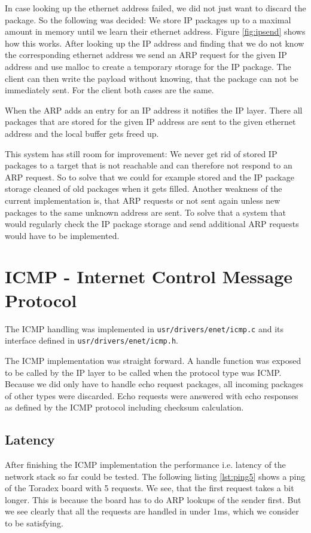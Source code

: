 In case looking up the ethernet address failed, we did not just want to discard the package. So the following was decided: We store IP packages up to a maximal amount in memory until we learn their ethernet address. Figure \ref{fig:ipsend} shows how this works. After looking up the IP address and finding that we do not know the corresponding ethernet address we send an ARP request for the given IP address and use malloc to create a temporary storage for the IP package. The client can then write the payload without knowing, that the package can not be immediately sent. For the client both cases are the same.

When the ARP adds an entry for an IP address it notifies the IP layer. There all packages that are stored for the given IP address are sent to the given ethernet address and the local buffer gets freed up.

This system has still room for improvement: We never get rid of stored IP packages to a target that is not reachable and can therefore not respond to an ARP request. So to solve that we could for example stored and the IP package storage cleaned of old packages when it gets filled. Another weakness of the current implementation is, that ARP requests or not sent again unless new packages to the same unknown address are sent. To solve that a system that would regularly check the IP package storage and send additional ARP requests would have to be implemented.

\section{ICMP - Internet Control Message Protocol}
The ICMP handling was implemented in \verb|usr/drivers/enet/icmp.c| and its interface defined in \verb|usr/drivers/enet/icmp.h|.

The ICMP implementation was straight forward. A handle function was exposed to be called by the IP layer to be called when the protocol type was ICMP. Because we did only have to handle echo request packages, all incoming packages of other types were discarded. Echo requests were answered with echo responses as defined by the ICMP protocol including checksum calculation.

\subsection{Latency}
After finishing the ICMP implementation the performance i.e. latency of the network stack so far could be tested. The following listing \ref{lst:ping5} shows a ping of the Toradex board with 5 requests. We see, that the first request takes a bit longer. This is because the board has to do ARP lookups of the sender first. But we see clearly that all the requests are handled in under 1ms, which we consider to be satisfying.


